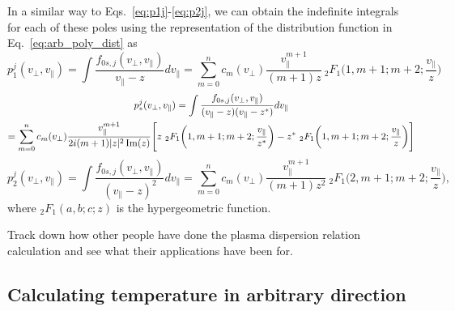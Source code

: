 In a similar way to Eqs.~\ref{eq:p1j}-\ref{eq:p2j}, we can obtain the indefinite integrals for each of these poles using the representation of the distribution function in Eq.~\ref{eq:arb_poly_dist} as
\begin{equation}
	p_1^j(v_\perp,v_\parallel) = \int \frac{f_{0s,j}(v_\perp, v_\parallel)}{v_\parallel-z} dv_\parallel = 
	\sum_{m=0}^n c_m(v_\perp) \frac{v_\parallel^{m+1}}{(m+1)z} \ _2F_1\bigg(1, m+1; m+2; \frac{v_\parallel}{z}\bigg)
	\label{eq:p1j_arb_poly}
\end{equation}
\begin{multline}
	p_*^j(v_\perp,v_\parallel) = \int \frac{f_{0s,j}(v_\perp, v_\parallel)}{(v_\parallel-z)(v_\parallel-z^*)} dv_\parallel \\
	= \sum_{m=0}^n c_m(v_\perp)
	\frac{v_\parallel^{m+1}}{2 i (m+1) |z|^2 \operatorname{Im}(z)} 
	\Bigg[z \ _2F_1\bigg(1, m+1; m+2; \frac{v_\parallel}{z^*}  \bigg)  - z^* \ _2F_1\bigg(1, m+1; m+2; \frac{v_\parallel}{z}  \bigg)\Bigg]
	\label{eq:pstarj_arb_poly}
\end{multline}
\begin{equation}
	p_2^j(v_\perp,v_\parallel) = \int \frac{f_{0s,j}(v_\perp, v_\parallel)}{(v_\parallel-z)^2} dv_\parallel = 
	\sum_{m=0}^n c_m(v_\perp) \frac{v_\parallel^{m+1}}{(m+1)z^2} \ _2F_1\bigg(2, m+1; m+2; \frac{v_\parallel}{z}\bigg),
	\label{eq:p2j_arb_poly}
\end{equation}
where $_2F_1(a, b; c; z)$ is the hypergeometric function. %

Track down how other people have done the plasma dispersion relation calculation and see what their applications have been for.



\subsection{Calculating temperature in arbitrary direction}

